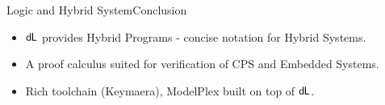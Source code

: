 \documentclass{beamer}
\newcommand{\dL}{\text{\upshape\textsf{d{\kern-0.05em}L}}}
\begin{document}
\begin{frame}{Logic and Hybrid System}{Conclusion}
  \begin{itemize}
    \item $\dL$ provides Hybrid Programs - concise notation for Hybrid Systems.
      \pause
    \item A proof calculus suited for verification of CPS and Embedded Systems.
      \pause
    \item Rich toolchain (Keymaera), ModelPlex built on top of $\dL$.
  \end{itemize}
\end{frame}
\end{document}
